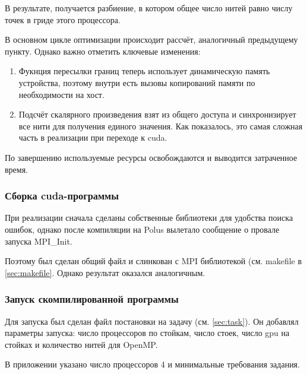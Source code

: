 \documentclass[12pt, fleqn]{article}
\theoremstyle{definition}
\begin{document}
В результате, получается разбиение, в котором общее число нитей равно числу точек в гриде этого процессора.

В основном цикле оптимизации происходит рассчёт, аналогичный предыдущему пункту. Однако важно отметить ключевые изменения: 
\begin{enumerate}
 \item Фукнция пересылки границ теперь использует динамическую память устройства, поэтому внутри есть вызовы копирований памяти по необходимости на хост.
 \item Подсчёт скалярного произведения взят из общего доступа и синхронизирует все нити для получения единого значения. Как показалось, это самая сложная часть в реализации при переходе к cuda.
\end{enumerate}

По завершению используемые ресурсы освобождаются и выводится затраченное время.

\subsubsection{Сборка cuda-программы}
При реализации сначала сделаны собственные библиотеки для удобства поиска ошибок, однако после компиляции на Polus вылетало сообщение о провале запуска MPI\_Init.

Поэтому был сделан общий файл и слинкован с MPI библиотекой (см. makefile в \ref{sec:makefile}. Однако результат оказался аналогичным.
\subsubsection{Запуск скомпилированной программы}
Для запуска был сделан файл постановки на задачу (см. \ref{sec:task}). Он добавлял параметры запуска: число процессоров по стойкам, число стоек, число gpu на стойках и количество нитей для OpenMP.

В приложении указано число процессоров 4 и минимальные требования задания.
\end{document}
